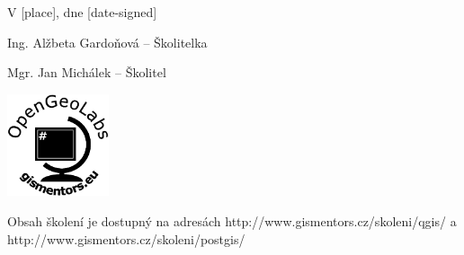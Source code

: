 \documentclass[12pt, a4paper]{letter}
\begin{document}
\vfill
\parbox{7cm}{

    V [place], dne [date-signed]\\

\vfill

    Ing. Alžbeta Gardoňová -- Školitelka\\

\vfill
    
    Mgr. Jan Michálek -- Školitel \\

}
\hfill
\parbox{3cm}{
    \includegraphics[width=3cm]{../images/placka.eps}
}


\begin{center}
{\footnotesize Obsah školení je dostupný na adresách
        http://www.gismentors.cz/skoleni/qgis/ a
        http://www.gismentors.cz/skoleni/postgis/}
\end{center}
\end{document}
